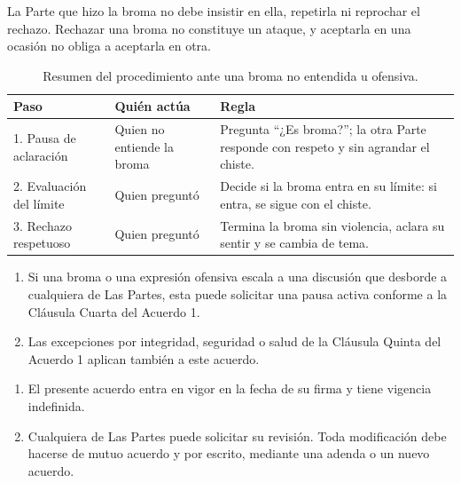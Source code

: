 La Parte que hizo la broma no debe insistir en ella, repetirla ni reprochar el rechazo. Rechazar una broma no constituye un ataque, y aceptarla en una ocasión no obliga a aceptarla en otra.

\begin{table}[H]
  \centering
  \small
  \begin{tabularx}{\textwidth}{@{} l >{\raggedright\arraybackslash}p{3.6cm} X @{}}
    \toprule
    \textbf{Paso}            & \textbf{Quién actúa}          & \textbf{Regla} \\
    \midrule
    1. Pausa de aclaración   & Quien no entiende la broma    & Pregunta \enquote{¿Es broma?}; la otra Parte responde con respeto y sin agrandar el chiste. \\
    2. Evaluación del límite & Quien preguntó                & Decide si la broma entra en su límite: si entra, se sigue con el chiste. \\
    3. Rechazo respetuoso    & Quien preguntó                & Termina la broma sin violencia, aclara su sentir y se cambia de tema. \\
    \bottomrule
  \end{tabularx}
  \caption{Resumen del procedimiento ante una broma no entendida u ofensiva.}
  \label{tab:bromas}
\end{table}


\begin{enumerate}[label=\arabic*., leftmargin=*, itemsep=0.3em]
  \item Si una broma o una expresión ofensiva escala a una discusión que desborde a cualquiera de Las Partes, esta puede solicitar una pausa activa conforme a la Cláusula Cuarta del Acuerdo 1.
  \item Las excepciones por integridad, seguridad o salud de la Cláusula Quinta del Acuerdo 1 aplican también a este acuerdo.
\end{enumerate}


\begin{enumerate}[label=\arabic*., leftmargin=*, itemsep=0.3em]
  \item El presente acuerdo entra en vigor en la fecha de su firma y tiene vigencia indefinida.
  \item Cualquiera de Las Partes puede solicitar su revisión. Toda modificación debe hacerse de mutuo acuerdo y por escrito, mediante una adenda o un nuevo acuerdo.
\end{enumerate}
